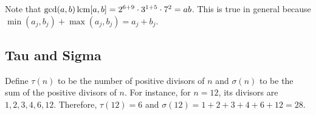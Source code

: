 Note that $\gcd(a,b)\operatorname{lcm}[a,b]=2^{6+9}\cdot 3^{1+5}\cdot 7^2=ab$. This is true in general because $\min(a_j, b_j)+\max(a_j, b_j)=a_j+b_j$. 

\clearpage

\subsection{Tau and Sigma}

\begin{defi} Define $\tau(n)$ to be the number of positive divisors of $n$ and $\sigma(n)$ to be the sum of the positive divisors of $n$. For instance, for $n=12$, its divisors are $1, 2, 3, 4, 6, 12$. Therefore, $\tau(12)=6$ and $\sigma(12)=1+2+3+4+6+12=28$. \end{defi}


\clearpage

